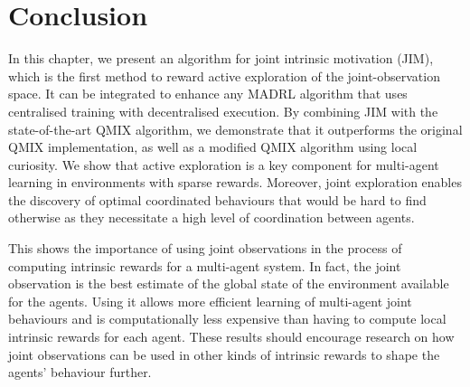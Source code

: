 
\section{Conclusion}

In this chapter, we present an algorithm for joint intrinsic motivation (JIM), which is the first method to reward active exploration of the joint-observation space. It can be integrated to enhance any MADRL algorithm that uses centralised training with decentralised execution. By combining JIM with the state-of-the-art QMIX algorithm, we demonstrate that it outperforms the original QMIX implementation, as well as a modified QMIX algorithm using local curiosity. We show that active exploration is a key component for multi-agent learning in environments with sparse rewards. Moreover, joint exploration enables the discovery of optimal coordinated behaviours that would be hard to find otherwise as they necessitate a high level of coordination between agents. 

This shows the importance of using joint observations in the process of computing intrinsic rewards for a multi-agent system. In fact, the joint observation is the best estimate of the global state of the environment available for the agents. Using it allows more efficient learning of multi-agent joint behaviours and is computationally less expensive than having to compute local intrinsic rewards for each agent. These results should encourage research on how joint observations can be used in other kinds of intrinsic rewards to shape the agents' behaviour further. 


